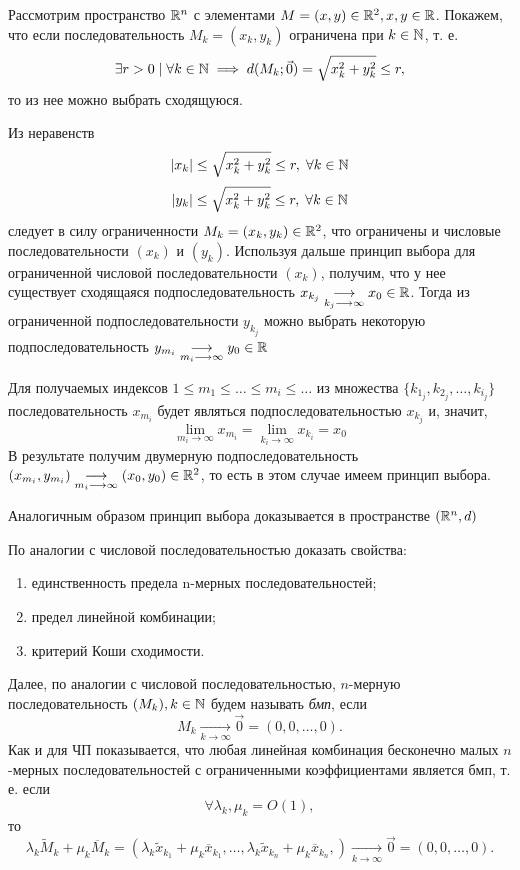 \documentclass[../../main.tex]{subfiles}
\begin{document}
  \begin{exmp}
    Рассмотрим пространство $\mathbb{R}^n$ с элементами
    $M=(x,y) \in \mathbb{R}^2, x,y \in \mathbb{R}$. 
    Покажем, что если последовательность $M_k=(x_k,y_k)$ ограничена 
    при $k \in \mathbb{N}$, т. е.
    \[
    \exists r>0 \; | \; \forall k \in \mathbb{N} 
    \implies d(M_k; \vec0)=\sqrt{x^2_k+y^2_k} \leq r,
    \]
    то из нее можно выбрать сходящуюся.
    
    Из неравенств
    \[ 
    |x_k| \leq \sqrt{x^2_k+y^2_k}\leq r, \; \forall k \in \mathbb{N} 
    \]
    \[ 
    |y_k| \leq \sqrt{x^2_k+y^2_k}\leq r, \; \forall k \in \mathbb{N} 
    \]
    следует в силу ограниченности $M_k=(x_k,y_k) \in \mathbb{R}^2$, 
    что ограничены и числовые последовательности
    $(x_k)$ и $(y_k)$. 
    Используя дальше принцип выбора для ограниченной 
    числовой последовательности $(x_k)$,
    получим, что у нее существует сходящаяся подпоследовательность
    $x_{k_j}\underset{k_j \longrightarrow \infty}
    {\longrightarrow}x_0 \in \mathbb{R}$.
    Тогда из ограниченной подпоследовательности $y_{k_j}$ 
    можно выбрать некоторую подпоследовательность
    $y_{m_i}\underset{m_i\longrightarrow \infty}
    {\longrightarrow}y_0 \in \mathbb{R}$
    
    Для получаемых индексов $1 \leq m_1 \leq \ldots 
    \leq m_i \leq \ldots $ из множества
    $\{k_{1_j}, k_{2_j}, \dots, k_{i_j}\}$
    последовательность $ x_{m_i} $ будет являться 
    подпоследовательностью $ x_{k_j} $ и, значит, 
    \[  \lim_{m_i \to \infty}{x_{m_i}}= 
    \lim_{k_i \to \infty}{x_{k_i}}=  x_0\]
    В результате получим двумерную подпоследовательность 
    $(x_{m_i}, y_{m_i}) \underset{m_i\longrightarrow \infty}
    {\longrightarrow} (x_0, y_0) \in \mathbb{R}^2$,
    то есть в этом случае имеем принцип выбора.
    
    Аналогичным образом принцип выбора доказывается в пространстве $
    (\mathbb{R}^n, d)$
  \end{exmp}

  \begin{exc}
    По аналогии с числовой последовательностью
    доказать свойства:
    \begin{enumerate}
      \item единственность  предела n-мерных последовательностей;
      \item предел линейной комбинации;
      \item критерий Коши сходимости.
    \end{enumerate}
  \end{exc}

  Далее, по аналогии с числовой последовательностью, 
  $n$-мерную последовательность $(M_k),  k \in \mathbb{N} $
  будем называть \emph{бмп}, если
  \[
    M_k \underset{k \longrightarrow \infty}
    {\longrightarrow}\vec{0} = (0,0,\dots,0).
  \]
  Как и для ЧП показывается, что любая линейная 
  комбинация бесконечно малых $n$-мерных последовательностей с 
  ограниченными коэффициентами является бмп, т. е. если
  \[
    \forall \lambda_k, \mu_{k} = O(1),
  \]
  то
  \[
    \lambda_k \widetilde{M}_k + \mu_k \overline{M}_k =
    (\lambda_k \widetilde{x}_{k_1} + \mu_k \overline{x}_{k_1}, 
    \dots,
    \lambda_k \widetilde{x}_{k_n} + \mu_k \overline{x}_{k_n},
    )
    \underset{k \longrightarrow \infty}{\longrightarrow}
    \vec{0} = (0,0,\dots,0).
  \]
\end{document}
